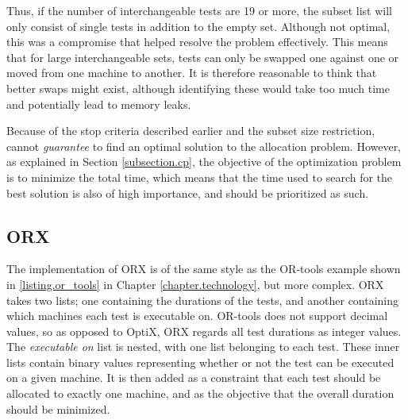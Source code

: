 Thus, if the number of interchangeable tests are 19 or more, the subset list will only consist of single tests in addition to the empty set. Although not optimal, this was a compromise that helped resolve the problem effectively. This means that for large interchangeable sets, tests can only be swapped one against one or moved from one machine to another. It is therefore reasonable to think that better swaps might exist, although identifying these would take too much time and potentially lead to memory leaks. 

Because of the stop criteria described earlier and the subset size restriction, \toolname \space cannot \emph{guarantee} to find an optimal solution to the allocation problem. However, as explained in Section \ref{subsection.cp}, the objective of the optimization problem is to minimize the total time, which means that the time used to search for the best solution is also of high importance, and should be prioritized as such.

\subsection{ORX}

The implementation of ORX is of the same style as the OR-tools example shown in \lstlistingname \space \ref{listing.or_tools} in Chapter \ref{chapter.technology}, but more complex. ORX takes two lists; one containing the durations of the tests, and another containing which machines each test is executable on. OR-tools does not support decimal values, so as opposed to OptiX, ORX regards all test durations as integer values. The \emph{executable on} list is nested, with one list belonging to each test. These inner lists contain binary values representing whether or not the test can be executed on a given machine. It is then added as a constraint that each test should be allocated to exactly one machine, and as the objective that the overall duration should be minimized.


